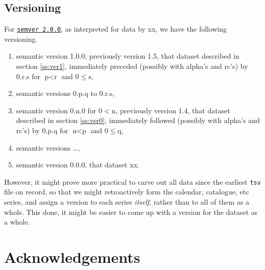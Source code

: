 \documentclass{amsart}%
\newcommand{\code}[1]{\texttt{#1}}%
\theoremstyle{plain}
\theoremstyle{definition}
\theoremstyle{remark}
\theoremstyle{definition}
\theoremstyle{remark}
\begin{document}
\subsection{Versioning}
\label{ss:versioning}
For \href{https://semver.org}{\code{semver 2.0.0}}, as interpreted for data by xx, we have the following versioning.%
\begin{enumerate}
\item semantic version 1.0.0, previously version 1.5, that dataset described in section \ref{ss:ver1}, immediately preceded (possibly with alpha's and rc's) by 0.r.s for \(\text{p}<\text{r}\) and \(0\leq\text{s}\),
\item semantic versions 0.p.q to 0.r.s,
\item semantic version 0.n.0 for \(0<\text{n}\), %
previously version 1.4, that dataset described in section \ref{ss:ver0}, immediately followed (possibly with alpha's and rc's) by 0.p.q for \(\text{n}<\text{p}\) and \(0\leq\text{q}\),
\item semantic versions \ldots,
\item semantic version 0.0.0, that dataset xx.%
\end{enumerate}
However, it might prove more practical to carve out all data since the earliest \code{tsv} file on record, so that we might retroactively form the calendar, catalogue, etc series, and assign a version to each series \emph{itself}, rather than to all of them as a whole. This done, it might be easier to come up with a version for the dataset as a whole.%
%
%
%
%
%
\section*{Acknowledgements}
\label{s:acknow}
\lipsum[1]
%
%
%
%
%
%
%
%
\end{document}
